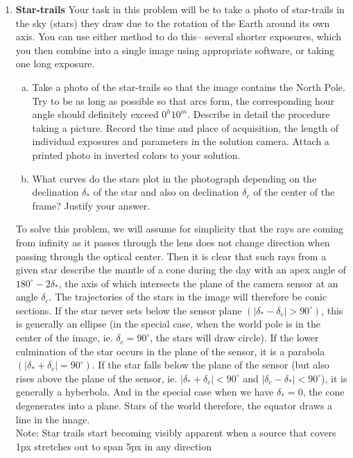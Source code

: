 \documentclass[a4paper,12pt]{extarticle}
\begin{document}
\begin{enumerate}
\item \textbf{Star-trails} Your task in this problem will be to take a photo of star-trails in the sky (stars) they draw due to the rotation of the Earth around its own axis. You can use either method to do this-- several shorter exposures, which you then combine into a single image using appropriate software, or taking one long exposure.

\begin{enumerate}[(a)]
	\item Take a photo of the star-trails so that the image contains the North Pole. Try to be as long as possible so that arcs form, the corresponding hour angle should definitely exceed $0^h10^m$. Describe in detail the procedure taking a picture. Record the time and place of acquisition, the length of individual exposures and parameters in the solution camera. Attach a printed photo in inverted colors to your solution.
	\item What curves do the stars plot in the photograph depending on the declination $\delta_\ast$ of the star and also on
	declination $\delta_c$ of the center of the frame? Justify your answer.
\end{enumerate}

\begin{sol}
To solve this problem, we will assume for simplicity that the rays are coming from infinity as it passes through the lens does not change direction when passing through the optical center. Then it is clear that such rays from a given star describe the mantle of a cone during the day
with an apex angle of $180^\circ - 2\delta_\ast$, the axis of which intersects the plane of the camera sensor at an angle
$\delta_c$. The trajectories of the stars in the image will therefore be conic sections. If the star never sets
below the sensor plane $(|\delta_\ast-\delta_c|> 90^\circ)$, this is generally an ellipse (in the special case, when the world pole is in the center of the image, ie. $\delta_c = 90^\circ$, the stars will draw circle). If the lower culmination of the star occurs in the plane of the sensor, it is a parabola  $(|\delta_\ast+\delta_c|=90^\circ)$. If the star falls below the plane of the sensor (but also rises above
the plane of the sensor, ie.  $|\delta_\ast +\delta_c|< 90^\circ$ and  $|\delta_c- \delta_\ast|< 90^\circ$), it is generally a hyberbola. And in the special case when we have $\delta_\ast = 0$, the cone degenerates into a plane. Stars of the world therefore, the equator draws a line in the image.\\

Note: Star trails start becoming visibly apparent when a source that covers 1px stretches out to span 5px in any direction
\end{sol}
\end{enumerate}
\end{document}

